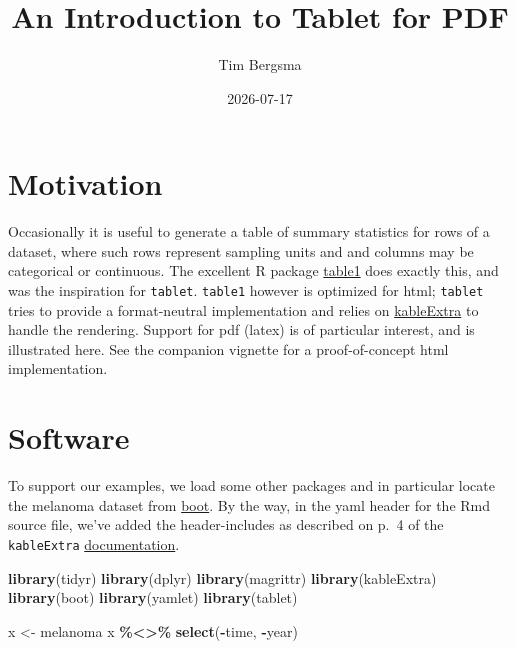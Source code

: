 \documentclass[
]{article}
\title{An Introduction to Tablet for PDF}
\author{Tim Bergsma}
\date{2026-07-17}
\newenvironment{Shaded}{\begin{snugshade}}{\end{snugshade}}
\newcommand{\FunctionTok}[1]{\textcolor[rgb]{0.13,0.29,0.53}{\textbf{#1}}}
\newcommand{\NormalTok}[1]{#1}
\newcommand{\OtherTok}[1]{\textcolor[rgb]{0.56,0.35,0.01}{#1}}
\newcommand{\SpecialCharTok}[1]{\textcolor[rgb]{0.81,0.36,0.00}{\textbf{#1}}}
\begin{document}
\maketitle

{
\setcounter{tocdepth}{2}
\tableofcontents
}
\section{Motivation}\label{motivation}

Occasionally it is useful to generate a table of summary statistics for
rows of a dataset, where such rows represent sampling units and and
columns may be categorical or continuous. The excellent R package
\href{https://CRAN.R-project.org/package=table1}{table1} does exactly
this, and was the inspiration for \texttt{tablet}. \texttt{table1}
however is optimized for html; \texttt{tablet} tries to provide a
format-neutral implementation and relies on
\href{https://CRAN.R-project.org/package=kableExtra}{kableExtra} to
handle the rendering. Support for pdf (latex) is of particular interest,
and is illustrated here. See the companion vignette for a
proof-of-concept html implementation.

\section{Software}\label{software}

To support our examples, we load some other packages and in particular
locate the melanoma dataset from
\href{https://CRAN.R-project.org/package=boot}{boot}. By the way, in the
yaml header for the Rmd source file, we've added the header-includes as
described on p.~4 of the \texttt{kableExtra}
\href{https://haozhu233.github.io/kableExtra/awesome_table_in_pdf.pdf}{documentation}.

\begin{Shaded}
\begin{Highlighting}[]
\FunctionTok{library}\NormalTok{(tidyr)}
\FunctionTok{library}\NormalTok{(dplyr)}
\FunctionTok{library}\NormalTok{(magrittr)}
\FunctionTok{library}\NormalTok{(kableExtra)}
\FunctionTok{library}\NormalTok{(boot)}
\FunctionTok{library}\NormalTok{(yamlet)}
\FunctionTok{library}\NormalTok{(tablet)}
\end{Highlighting}
\end{Shaded}

\begin{Shaded}
\begin{Highlighting}[]
\NormalTok{x }\OtherTok{\textless{}{-}}\NormalTok{ melanoma}
\NormalTok{x }\SpecialCharTok{\%\textless{}\textgreater{}\%} \FunctionTok{select}\NormalTok{(}\SpecialCharTok{{-}}\NormalTok{time, }\SpecialCharTok{{-}}\NormalTok{year)}
\end{Highlighting}
\end{Shaded}
\end{document}
